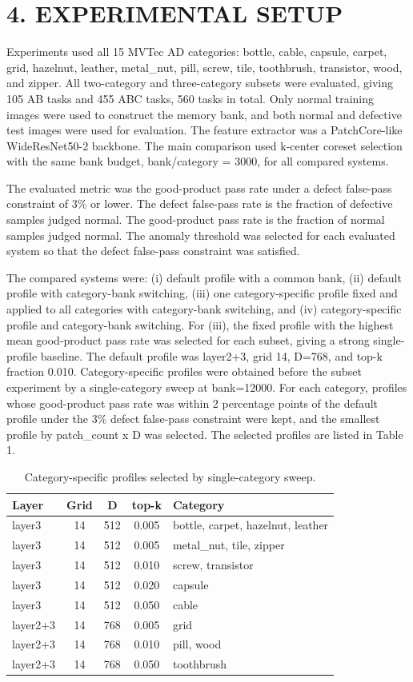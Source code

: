 \documentclass[a4paper,twocolumn,10pt]{article}
\begin{document}
\section*{4. EXPERIMENTAL SETUP}
Experiments used all 15 MVTec AD categories: bottle, cable, capsule, carpet, grid, hazelnut, leather, metal\_nut, pill, screw, tile, toothbrush, transistor, wood, and zipper. All two-category and three-category subsets were evaluated, giving 105 AB tasks and 455 ABC tasks, 560 tasks in total. Only normal training images were used to construct the memory bank, and both normal and defective test images were used for evaluation. The feature extractor was a PatchCore-like WideResNet50-2 backbone. The main comparison used k-center coreset selection with the same bank budget, bank/category = 3000, for all compared systems.

The evaluated metric was the good-product pass rate under a defect false-pass constraint of 3\% or lower. The defect false-pass rate is the fraction of defective samples judged normal. The good-product pass rate is the fraction of normal samples judged normal. The anomaly threshold was selected for each evaluated system so that the defect false-pass constraint was satisfied.

The compared systems were: (i) default profile with a common bank, (ii) default profile with category-bank switching, (iii) one category-specific profile fixed and applied to all categories with category-bank switching, and (iv) category-specific profile and category-bank switching. For (iii), the fixed profile with the highest mean good-product pass rate was selected for each subset, giving a strong single-profile baseline. The default profile was layer2+3, grid 14, D=768, and top-k fraction 0.010. Category-specific profiles were obtained before the subset experiment by a single-category sweep at bank=12000. For each category, profiles whose good-product pass rate was within 2 percentage points of the default profile under the 3\% defect false-pass constraint were kept, and the smallest profile by patch\_count x D was selected. The selected profiles are listed in Table 1.

\begin{table}[h]\centering\small
\caption{Category-specific profiles selected by single-category sweep.}
\begin{tabular}{lcccl}\toprule Layer & Grid & D & top-k & Category\\\midrule
layer3 & 14 & 512 & 0.005 & bottle, carpet, hazelnut, leather\\
layer3 & 14 & 512 & 0.005 & metal\_nut, tile, zipper\\
layer3 & 14 & 512 & 0.010 & screw, transistor\\
layer3 & 14 & 512 & 0.020 & capsule\\
layer3 & 14 & 512 & 0.050 & cable\\
layer2+3 & 14 & 768 & 0.005 & grid\\
layer2+3 & 14 & 768 & 0.010 & pill, wood\\
layer2+3 & 14 & 768 & 0.050 & toothbrush\\
\bottomrule\end{tabular}\end{table}
\end{document}
